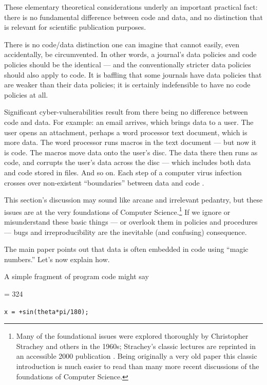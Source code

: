 \documentclass[10pt,a4paper]{article}
\begin{document}
These elementary theoretical considerations underly an important practical fact: there is no fundamental difference between code and data, and no distinction that is relevant for scientific publication purposes. 

There is no code/data distinction one can imagine that cannot easily, even accidentally, be circumvented. In other words, a journal's data policies and code policies should be the identical --- and the conventionally stricter data policies should also apply to code. It is baffling that some journals have data policies that are weaker than their data policies; it is certainly indefensible to have no code policies at all.

{Significant cyber-vulnerabilities result from there being no difference between code and data. For example: an email arrives, which brings data to a user. The user opens an attachment, perhaps a word processor text document, which is more data. The word processor runs macros in the text document --- but now it is code. The macros move data onto the user's disc. The data there then runs as code, and corrupts the user's data across the disc --- which includes both data and code stored in files. And so on. Each step of a computer virus infection crosses over non-existent ``boundaries'' between data and code \cite{viruses}.}

This section's discussion may sound like arcane and irrelevant pedantry, but these issues are at the very foundations of Computer Science.\footnote{{Many of the foundational issues were explored thoroughly by Christopher Strachey and others in the 1960s; Strachey's classic lectures are reprinted in an accessible 2000 publication \cite{strachey}. Being originally a very old paper this classic introduction is much easier to read than many more recent discussions of the foundations of Computer Science.}} If we ignore or misunderstand these basic things --- or overlook them in policies and procedures --- bugs and irreproducibility are the inevitable (and confusing) consequence.

The main paper points out that data is often embedded in code using ``magic numbers.'' Let's now explain how. 

A simple fragment of program code might say

\newcount \magicNumber \magicNumber = 324
\begin{center}\texttt{x = \the\magicNumber+sin(theta*pi/180);}\end{center}
\end{document}
